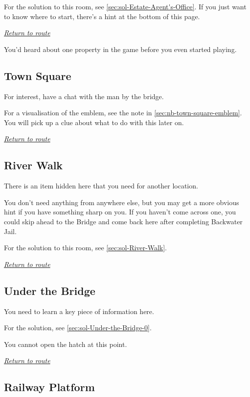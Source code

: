 \documentclass[a5paper]{extarticle}
\begin{document}
For the solution to this room, see \cref{sec:sol-Estate-Agent's-Office}.
If you just want to know where to start, there's a hint at the bottom of this page.

\hyperref[sec:route-1]{\emph{Return to route}}

\vfill
You'd heard about one property in the game before you even started playing.

\newpage
\subsection{Town Square}\label{sec:req-Town-Square-0}

For interest, have a chat with the man by the bridge.

For a visualisation of the emblem, see the note in \cref{sec:nb-town-square-emblem}.
You will pick up a clue about what to do with this later on.

\hyperref[sec:route-1]{\emph{Return to route}}

\newpage
\subsection{River Walk}\label{sec:req-River-Walk}

There is an item hidden here that you need for another location.

You don't need anything from anywhere else,
but you may get a more obvious hint if you have something sharp on you.
If you haven't come across one, you could skip ahead to the Bridge
and come back here after completing Backwater Jail.

For the solution to this room, see \cref{sec:sol-River-Walk}.

\hyperref[sec:route-1]{\emph{Return to route}}

\newpage
\subsection{Under the Bridge}\label{sec:req-Under-the-Bridge-0}

You need to learn a key piece of information here.

For the solution, see \cref{sec:sol-Under-the-Bridge-0}.

You cannot open the hatch at this point.

\hyperref[sec:route-1]{\emph{Return to route}}

\newpage
\subsection{Railway Platform}\label{sec:req-Railway-Platform}
\end{document}
